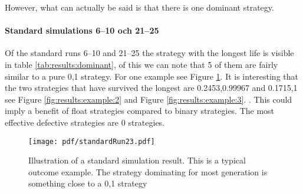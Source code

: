 
However, what can actually be said is that there is one dominant strategy.\mypar

\paragraph{Standard simulations 6--10 och 21--25}
Of the standard runs 6--10 and 21--25 the strategy with the longest life is visible in table \ref{tab:results:dominant}, of this we can note that 5 of them are fairly similar to a pure 0,1 strategy. For one example see Figure \ref{fig:resulsts:example:1}. It is interesting that the two strategies that have survived the longest are 0.2453,0.99967 and 0.1715,1 see Figure \ref{fig:results:example:2}  and Figure \ref{fig:results:example:3}. \mypar. This could imply a benefit of float strategies compared to binary strategies. The most effective defective strategies are 0 strategies.


\begin{figure}[htbp]
\centering
\texttt{[image: pdf/standardRun23.pdf]}
\caption{Illustration of a standard simulation result. This is a
  typical outcome example. The strategy dominating for most generation
  is something close to a 0,1 strategy}
\label{fig:resulsts:example:1}
\end{figure}

